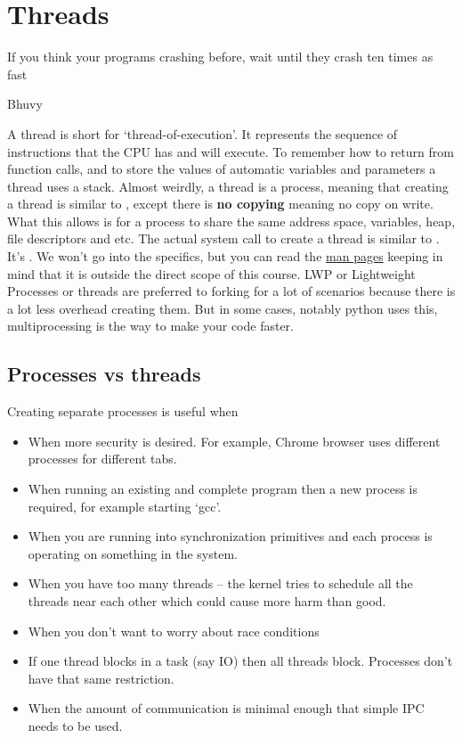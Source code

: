 \chapter{Threads}

\epigraph{If you think your programs crashing before, wait until they crash ten times as fast}{Bhuvy}

A thread is short for `thread-of-execution'.
It represents the sequence of instructions that the CPU has and will execute.
To remember how to return from function calls, and to store the values of automatic variables and parameters a thread uses a stack.
Almost weirdly, a thread is a process, meaning that creating a thread is similar to , except there is \textbf{no copying} meaning no copy on write.
What this allows is for a process to share the same address space, variables, heap, file descriptors and etc.
The actual system call to create a thread is similar to . It's .
We won't go into the specifics, but you can read the \href{http://man7.org/linux/man-pages/man2/clone.2.html}{man pages} keeping in mind that it is outside the direct scope of this course.
LWP or Lightweight Processes or threads are preferred to forking for a lot of scenarios because there is a lot less overhead creating them.
But in some cases, notably python uses this, multiprocessing is the way to make your code faster.

\section{Processes vs threads}

Creating separate processes is useful when

\begin{itemize}
\item When more security is desired. For example, Chrome browser uses different processes for different tabs.
\item When running an existing and complete program then a new process is required, for example starting `gcc'.
\item When you are running into synchronization primitives and each process is operating on something in the system.
\item When you have too many threads -- the kernel tries to schedule all the threads near each other which could cause more harm than good.
\item When you don't want to worry about race conditions
\item If one thread blocks in a task (say IO) then all threads block. Processes don't have that same restriction.
\item When the amount of communication is minimal enough that simple IPC needs to be used.
\end{itemize}

